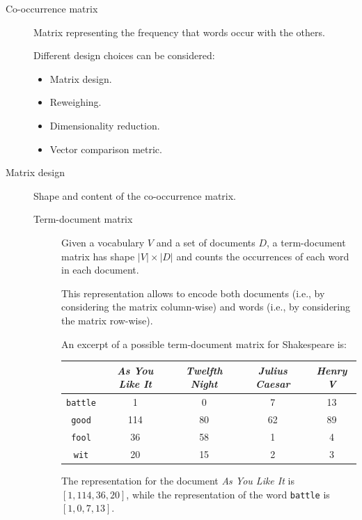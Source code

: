\begin{description}
    \item[Co-occurrence matrix] 
        Matrix representing the frequency that words occur with the others.

        Different design choices can be considered:
        \begin{itemize}
            \item Matrix design.
            \item Reweighing.
            \item Dimensionality reduction.
            \item Vector comparison metric.
        \end{itemize}

    \item[Matrix design] 
        Shape and content of the co-occurrence matrix.

        \begin{description}
            \item[Term-document matrix] 
                Given a vocabulary $V$ and a set of documents $D$, a term-document matrix has shape $|V| \times |D|$ and counts the occurrences of each word in each document.

                \begin{remark}
                    This representation allows to encode both documents (i.e., by considering the matrix column-wise) and words (i.e., by considering the matrix row-wise).
                \end{remark}

                \begin{example}
                    An excerpt of a possible term-document matrix for Shakespeare is:
                    \begin{table}[H]
                        \centering
                        \footnotesize
                        \begin{tabular}{ccccc}
                            \toprule
                            & \textit{As You Like It} & \textit{Twelfth Night} & \textit{Julius Caesar} & \textit{Henry V} \\
                            \midrule
                            \texttt{battle} & 1 & 0 & 7 & 13 \\
                            \texttt{good} & 114 & 80 & 62 & 89 \\
                            \texttt{fool} & 36 & 58 & 1 & 4 \\
                            \texttt{wit} & 20 & 15 & 2 & 3 \\
                            \bottomrule
                        \end{tabular}
                    \end{table}
                    The representation for the document \textit{As You Like It} is $[1, 114, 36, 20]$, while the representation of the word \texttt{battle} is $[1, 0, 7, 13]$.
                \end{example}


\end{description}
\end{description}
